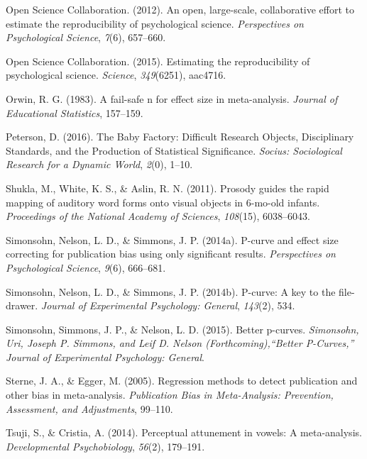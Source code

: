 \documentclass[english,floatsintext,man]{apa6}
\begin{document}
\hypertarget{ref-open2012open}{}
Open Science Collaboration. (2012). An open, large-scale, collaborative
effort to estimate the reproducibility of psychological science.
\emph{Perspectives on Psychological Science}, \emph{7}(6), 657--660.

\hypertarget{ref-open2015estimating}{}
Open Science Collaboration. (2015). Estimating the reproducibility of
psychological science. \emph{Science}, \emph{349}(6251), aac4716.

\hypertarget{ref-orwin1983fail}{}
Orwin, R. G. (1983). A fail-safe n for effect size in meta-analysis.
\emph{Journal of Educational Statistics}, 157--159.

\hypertarget{ref-Peterson:2016}{}
Peterson, D. (2016). The Baby Factory: Difficult Research Objects,
Disciplinary Standards, and the Production of Statistical Significance.
\emph{Socius: Sociological Research for a Dynamic World}, \emph{2}(0),
1--10.

\hypertarget{ref-shukla2011prosody}{}
Shukla, M., White, K. S., \& Aslin, R. N. (2011). Prosody guides the
rapid mapping of auditory word forms onto visual objects in 6-mo-old
infants. \emph{Proceedings of the National Academy of Sciences},
\emph{108}(15), 6038--6043.

\hypertarget{ref-simonsohn2014power}{}
Simonsohn, Nelson, L. D., \& Simmons, J. P. (2014a). P-curve and effect
size correcting for publication bias using only significant results.
\emph{Perspectives on Psychological Science}, \emph{9}(6), 666--681.

\hypertarget{ref-simonsohn2014p}{}
Simonsohn, Nelson, L. D., \& Simmons, J. P. (2014b). P-curve: A key to
the file-drawer. \emph{Journal of Experimental Psychology: General},
\emph{143}(2), 534.

\hypertarget{ref-simonsohn2015better}{}
Simonsohn, Simmons, J. P., \& Nelson, L. D. (2015). Better p-curves.
\emph{Simonsohn, Uri, Joseph P. Simmons, and Leif D. Nelson
(Forthcoming),``Better P-Curves,'' Journal of Experimental Psychology:
General}.

\hypertarget{ref-sterne2005regression}{}
Sterne, J. A., \& Egger, M. (2005). Regression methods to detect
publication and other bias in meta-analysis. \emph{Publication Bias in
Meta-Analysis: Prevention, Assessment, and Adjustments}, 99--110.

\hypertarget{ref-tsuji2014perceptual}{}
Tsuji, S., \& Cristia, A. (2014). Perceptual attunement in vowels: A
meta-analysis. \emph{Developmental Psychobiology}, \emph{56}(2),
179--191.
\end{document}
